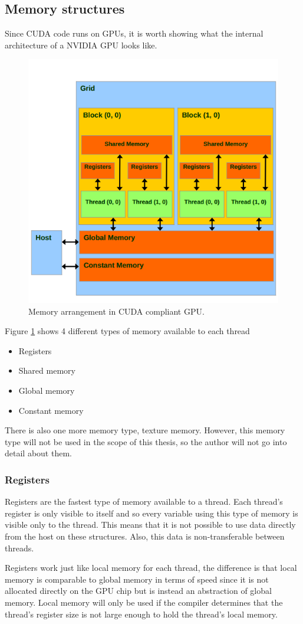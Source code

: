 \documentclass[12pt, openany]{book}
\begin{document}
\subsection{Memory structures}
Since CUDA code runs on GPUs, it is worth showing what the internal architecture of a NVIDIA GPU looks like. 
\begin{figure}[H]
	\centering
	\includegraphics[width=0.8\linewidth]{Resources/Images/cudaMemory.png}
	\caption{Memory arrangement in CUDA compliant GPU.}
	\label{fig:memCuda}
\end{figure}

Figure \ref{fig:memCuda} shows 4 different types of memory available to each thread
\begin{itemize}
	\item Registers
	\item Shared memory
	\item Global memory
	\item Constant memory
\end{itemize}

There is also one more memory type, texture memory. However, this memory type will not be used in the scope of this thesis, so the author will not go into detail about them.
\subsubsection{Registers}
Registers are the fastest type of memory available to a thread. Each thread's register is only visible to itself and so every variable using this type of memory is visible only to the thread. This means that it is not possible to use data directly from the host on these structures. Also, this data is non-transferable between threads. \par Registers work just like local memory for each thread, the difference is that local memory is comparable to global memory in terms of speed since it is not allocated directly on the GPU chip but is instead an abstraction of global memory. Local memory will only be used if the compiler determines that the thread's register size is not large enough to hold the thread's local memory.
\end{document}
